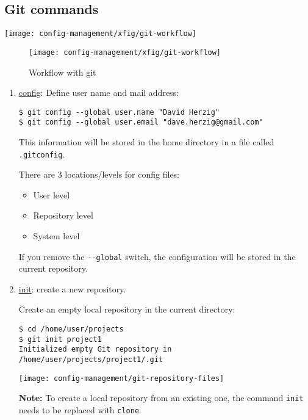 \subsection{Git commands}
\ifslides
\begin{center}
  \texttt{[image: config-management/xfig/git-workflow]}
\end{center}
\else
\begin{figure}[H]
\centering
  \texttt{[image: config-management/xfig/git-workflow]}
\caption{Workflow with git}
\end{figure}
\fi
\begin{enumerate}
\item \underline{config}: Define user name and mail address:
  \begin{lstlisting}
$ git config --global user.name "David Herzig"
$ git config --global user.email "dave.herzig@gmail.com"
  \end{lstlisting}
This information will be stored in the home directory in a file called
\verb+.gitconfig+.

There are 3 locations/levels for config files:
\begin{itemize}
\item User level
\item Repository level
\item System level
\end{itemize}

If you remove the \verb|--global| switch, the configuration will be
stored in the current repository.

%
\newslide
\item \underline{init}:
  create a new repository.

Create an empty local repository in the current directory:
  \begin{lstlisting}
$ cd /home/user/projects
$ git init project1
Initialized empty Git repository in /home/user/projects/project1/.git
  \end{lstlisting}
\begin{center}
\texttt{[image: config-management/git-repository-files]}
\end{center}
%
{\bfseries Note:} To create a local repository from an existing one,
the command \verb|init| needs to be replaced with \verb|clone|.


\end{enumerate}
